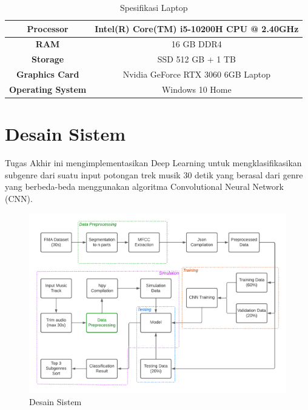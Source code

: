 	\begin{table}[h]
		\centering
		
		\caption{Spesifikasi Laptop}
		\begin{adjustbox}{width=0.7\columnwidth, center}
		\begin{tabular}{|c|c|}
			\hline
			\textbf{Processor}        & Intel(R) Core(TM) i5-10200H CPU @ 2.40GHz \\ \hline
			\textbf{RAM}              & 16 GB DDR4                                \\ \hline
			\textbf{Storage}          & SSD 512 GB + 1 TB                         \\ \hline
			\textbf{Graphics Card}    & Nvidia GeForce RTX 3060 6GB Laptop        \\ \hline
			\textbf{Operating System} & Windows 10 Home                           \\ \hline
		\end{tabular}
	\end{adjustbox}
		\label{fig:laptoptable}
	\end{table}

\section{Desain Sistem}
\label{sec:desainsistem}

Tugas Akhir ini mengimplementasikan Deep Learning untuk mengklasifikasikan subgenre dari suatu input potongan trek musik 30 detik yang berasal dari genre yang berbeda-beda menggunakan algoritma Convolutional Neural Network (CNN).

\begin{figure}[H]
	\centering
	
	\includegraphics[width=1\textwidth]{gambar/desain sistem3}
	
	\caption{Desain Sistem}
	\label{fig:desainsistem}
\end{figure}

